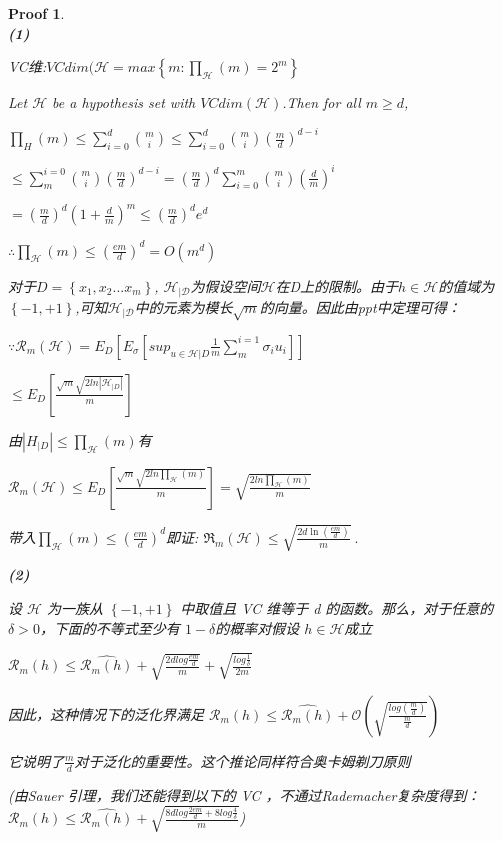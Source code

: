 \documentclass[a4paper,UTF8]{article}
\numberwithin{equation}{section}
\newtheorem*{myProof}{Proof}
\begin{document}
	\begin{myProof}~\\ 
		
		\textbf{(1)} 
		
		VC维:$VCdim(\mathcal{H} = max\left \{ m:\prod _{\mathcal{H}}(m)=2^m \right \} $
		
		Let $\mathcal{H}$ be a hypothesis set with $VCdim(\mathcal{H})$.Then for all $m \geq d$,
		
		$\prod _{H}(m) \leq \sum_{i=0}^{d}\binom{m}{i} \leq \sum_{i=0}^{d} \binom{m}{i}(\frac{m}{d} )^{d-i}$
		
		$\leq \sum_{m}^{i=0}\binom{m}{i}(\frac{m}{d} )^{d-i}=(\frac{m}{d} )^d\sum_{i=0}^{m}\binom{m}{i}  (\frac{d}{m} )^i$
		
		$=\left ( \frac{m}{d}  \right )^d(1+\frac{d}{m})^m \leq (\frac{m}{d} )^de^d  $
		
		$\therefore  {\textstyle \prod_{\mathcal{H}}}(m) \leq (\frac{em}{d} )^d = O(m^d) $
		
		对于$D = \left \{ x_1, x_2... x_m \right \} $, $\mathcal{H_{|D}}$为假设空间$\mathcal{H}$在D上的限制。由于$h\in \mathcal{H}$的值域为$\left \{ -1,+1 \right \} $,可知$\mathcal{H_{|D}}$中的元素为模长$\sqrt{m} $的向量。因此由ppt中定理可得：
		
		$\because \mathcal{R}_m(\mathcal{H}) = E_D[E_\sigma [sup_{u\in \mathcal{H}|D}\frac{1}{m}\sum_{m}^{i=1}\sigma _iu_i  ]]$
		
		$\leq E_D[\frac{\sqrt{m}\sqrt{2ln|\mathcal{H}_{|D}|}  }{m} ]$
		
		由$|H_{|D}| \leq  {\textstyle \prod_{\mathcal{H}}}(m) $有
		
		$\mathcal{R}_m(\mathcal{H}) \leq E_D[\frac{\sqrt{m}\sqrt{2ln {\textstyle \prod_{\mathcal{H}}}(m) }  }{m} ] = \sqrt{\frac{2ln{\textstyle \prod_{\mathcal{H}}}(m) }{m} } $
		
		带入${\textstyle \prod_{\mathcal{H}}}(m) \leq \left ( \frac{em}{d}  \right ) ^d$即证: $\mathfrak{R}_m(\mathcal{H})\leq\sqrt{\frac{2d\ln\left(\frac{em}{d}\right)}{m}}~. $
		
		\textbf{(2)}
		
		设 $\mathcal{H}$ 为一族从 $\left \{ -1,+1 \right \} $ 中取值且 VC 维等于 d 的函数。那么，对于任意的 $\delta >0$，下面的不等式至少有 $1-\delta$的概率对假设 $h \in \mathcal{H}$成立
		
		$\mathcal{R}_m(h) \leq \hat{\mathcal{R}_m(h)} + \sqrt{\frac{2dlog\frac{em}{d} }{m} }+\sqrt{\frac{log\frac{1}{\delta} }{2m} }  $
		
		因此，这种情况下的泛化界满足
		$\mathcal{R}_m(h) \leq \hat{\mathcal{R}_m(h)} + \mathcal{O}(\sqrt{\frac{log(\frac{m}{d} )}{\frac{m}{d} } } )$
		
		它说明了$\frac{m}{d} $对于泛化的重要性。这个推论同样符合奥卡姆剃刀原则
		
		(由Sauer 引理，我们还能得到以下的 VC ，不通过Rademacher复杂度得到：
		$\mathcal{R}_m(h) \leq \hat{\mathcal{R}_m(h)} + \sqrt{\frac{8dlog\frac{2em}{d} +8log\frac{4}{\delta} }{m} } $)
		
		
	\end{myProof}
	
\end{document}
